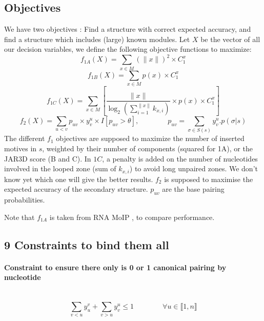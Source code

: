 \documentclass{article}
\begin{document}
\subsection{Objectives \label{objectives}}
We have two objectives : Find a structure with correct expected accuracy, and find a structure which includes (large) known modules.
Let $X$ be the vector of all our decision variables, we define the following objective functions to maximize:
\[ f_{1A}(X) = \sum_{x \in M} (\|x\|)^2 \times C^x_1  \]
\[ f_{1B}(X) = \sum_{x \in M} p(x) \times C^x_1 \]
\[ f_{1C}(X) = \sum_{x \in M} \left[ \frac{\|x\|}{\log_2(\sum_{i=1}^{\|x\|}k_{x,i})} \times p(x) \times C^x_1 \right]\]
$$ f_2(X) = \sum_{u<v} p_{uv}\times y^u_v \times I[p_{uv}>\theta], \qquad \qquad
p_{uv} = \sum_{\sigma \in S(s)} y^u_v.p(\sigma | s)$$
The different $f_1$ objectives are supposed to maximize the number of inserted motives in $s$, 
weighted by their number of components (squared for 1A), or the JAR3D score (B and C). 
In $1C$, a penalty is added on the number of nucleotides involved in the looped zone (sum of $k_{x,i}$) to avoid long unpaired zones. 
We don't know yet which one will give the better results.
$f_2$ is supposed to maximise the expected accuracy of the secondary structure. 
$p_{uv}$ are the base pairing probabilities.

Note that \(f_{1A}\) is taken from RNA MoIP \cite{reinharz_towards_2012}, to compare performance.

\subsection{9 Constraints to bind them all}
\paragraph{Constraint to ensure there only is 0 or 1 canonical pairing by nucleotide} ~ 
\begin{equation} \label{constraint:1}
	\sum_{v<u} y^v_u + \sum_{v>u} y^u_v \leq 1 \qquad\qquad \forall u \in \llbracket 1,n \rrbracket
\end{equation}
	
\end{document}
